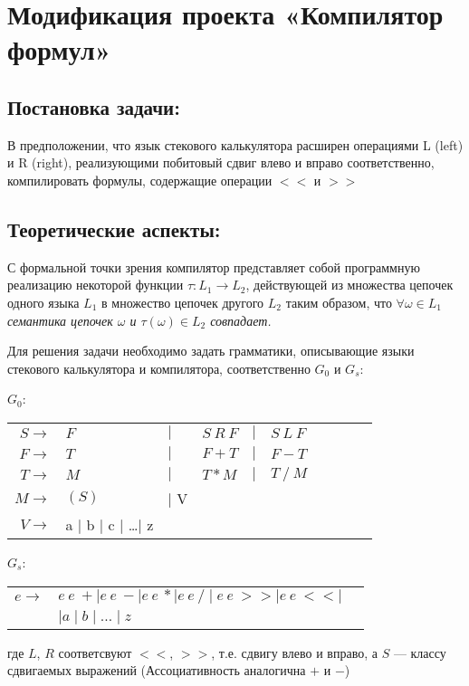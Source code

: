 \section{Модификация проекта «Компилятор формул»}

\subsection{Постановка задачи:}
В предположении, что язык стекового калькулятора
расширен операциями L (left) и R (right),
реализующими побитовый сдвиг влево и вправо соответственно, компилировать
формулы, содержащие операции $<<$ и $>>$

\subsection{Теоретические аспекты:}
С формальной точки зрения компилятор представляет собой программную реализацию
некоторой функции $\tau\colon L_1 \rightarrow L_2$, действующей из множества
цепочек одного языка $L_1$ в множество цепочек другого $L_2$ таким образом, что
$\forall \omega \in L_1$ {\em семантика цепочек $\omega$ и $\tau(\omega)\in L_2$
 совпадает.}

Для решения задачи необходимо задать грамматики, описывающие языки стекового
калькулятора и компилятора, соответственно $G_0$ и $G_s$:

$G_0$:
\medskip
\noindent\hspace{2cm}
\begin{tabular}{rlllllllll}
$S \rightarrow$ & $F $&$\mid$&$ S~R~F$&$\mid$&$ S~L~F$\\
$F \rightarrow$ & $T $&$\mid$&$ F+T$&$\mid$&$ F-T$\\
$T \rightarrow$ & $M $&$\mid$&$ T*M$&$\mid$&$ T~/~M$\\
$M \rightarrow$ & $(S)$&$\mid$ V\\
$V \rightarrow$ & a $\mid$ b $\mid$ c $\mid$ \dots $\mid$ z\\
\end{tabular}
\medskip

$G_s$:
\medskip
\noindent\hspace{2cm}
\begin{tabular}{rll}
$e\rightarrow$ & $e~e~+ \mid e~e~-\mid e~e~* \mid e~e~/ \mid e~e~>>\mid e~e~<<\mid$\\
&$\mid a \mid b \mid \dots \mid z$
\end{tabular}

 где $L$, $R$ соответсвуют $<<$, $>>$, т.е. сдвигу влево и вправо,
 а $S$ --- классу сдвигаемых выражений (Ассоциативность аналогична $+$ и $-$)

